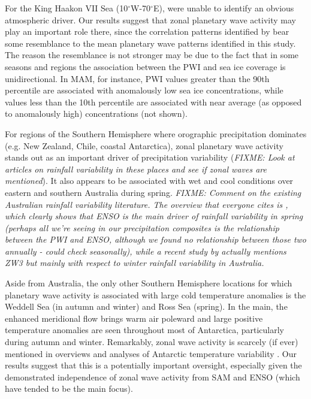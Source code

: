 For the King Haakon VII Sea (10$^{\circ}$W-70$^{\circ}$E), \citet{Raphael2014} were unable to identify an obvious atmospheric driver. Our results suggest that zonal planetary wave activity may play an important role there, since the correlation patterns identified by \citet{Raphael2014} bear some resemblance to the mean planetary wave patterns identified in this study. The reason the resemblance is not stronger may be due to the fact that in some seasons and regions the association between the PWI and sea ice coverage is unidirectional. In MAM, for instance, PWI values greater than the 90th percentile are associated with anomalously low sea ice concentrations, while values less than the 10th percentile are associated with near average (as opposed to anomalously high) concentrations (not shown).

For regions of the Southern Hemisphere where orographic precipitation dominates (e.g. New Zealand, Chile, coastal Antarctica), zonal planetary wave activity stands out as an important driver of precipitation variability (\textit{FIXME: Look at articles on rainfall variability in these places and see if zonal waves are mentioned}). It also appears to be associated with wet and cool conditions over eastern and southern Australia during spring. \textit{FIXME: Comment on the existing Australian rainfall variability literature. The overview that everyone cites is \citet{Risbey2009}, which clearly shows that ENSO is the main driver of rainfall variability in spring (perhaps all we're seeing in our precipitation composites is the relationship between the PWI and ENSO, although we found no relationship between those two annually - could check seasonally), while a recent study by \citet{Frederiksen2014} actually mentions ZW3 but mainly with respect to winter rainfall variability in Australia.}

Aside from Australia, the only other Southern Hemisphere locations for which planetary wave activity is associated with large cold temperature anomalies is the Weddell Sea (in autumn and winter) and Ross Sea (spring). In the main, the enhanced meridional flow brings warm air poleward and large positive temperature anomalies are seen throughout most of Antarctica, particularly during autumn and winter. Remarkably, zonal wave activity is scarcely (if ever) mentioned in overviews and analyses of Antarctic temperature variability \citep[e.g.][]{Russell2010,SchneiderOkumura2012,Yu2012}. Our results suggest that this is a potentially important oversight, especially given the demonstrated independence of zonal wave activity from SAM and ENSO (which have tended to be the main focus).   

